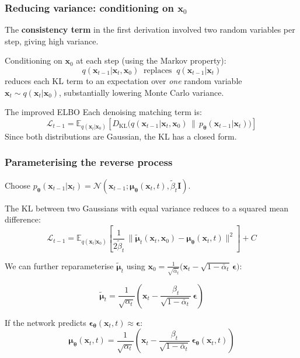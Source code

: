 \documentclass{beamer}
\newcommand{\E}{\mathbb{E}}
\newcommand{\DKL}{D_{\mathrm{KL}}}
\newcommand{\Norm}{\mathcal{N}}
\begin{document}
\begin{frame}
\frametitle{Reducing variance: conditioning on $\bm{x}_0$}

The \textbf{consistency term} in the first derivation involved
two random variables per step, giving high variance.

Conditioning on $\bm{x}_0$ at each step (using the Markov property):
\[
  q(\bm{x}_{t-1}|\bm{x}_t,\bm{x}_0)
  \;\;\text{replaces}\;\;
  q(\bm{x}_{t-1}|\bm{x}_t)
\]
reduces each KL term to an expectation over \emph{one} random variable
$\bm{x}_t \sim q(\bm{x}_t|\bm{x}_0)$, substantially lowering Monte Carlo variance.

\begin{block}{The improved ELBO}
Each denoising matching term is:
\[
  \mathcal{L}_{t-1}
  = \E_{q(\bm{x}_t|\bm{x}_0)}\!\left[
    \DKL\!\bigl(q(\bm{x}_{t-1}|\bm{x}_t,\bm{x}_0)\,\|\,
               p_{\bm{\theta}}(\bm{x}_{t-1}|\bm{x}_t)\bigr)
  \right]
\]
Since both distributions are Gaussian, the KL has a closed form.
\end{block}
\end{frame}

\begin{frame}
\frametitle{Parameterising the reverse process}

Choose $p_{\bm{\theta}}(\bm{x}_{t-1}|\bm{x}_t)
= \Norm(\bm{x}_{t-1};\bm{\mu}_{\bm{\theta}}(\bm{x}_t,t),\tilde\beta_t\mathbf{I})$.

The KL between two Gaussians with equal variance reduces to a squared
mean difference:
\[
  \mathcal{L}_{t-1}
  = \E_{q(\bm{x}_t|\bm{x}_0)}\!\left[
    \frac{1}{2\tilde\beta_t}\,
    \bigl\|\tilde{\bm{\mu}}_t(\bm{x}_t,\bm{x}_0)
          - \bm{\mu}_{\bm{\theta}}(\bm{x}_t,t)\bigr\|^2
  \right] + C
\]

We can further reparameterise $\tilde{\bm{\mu}}_t$ using
$\bm{x}_0 = \tfrac{1}{\sqrt{\bar\alpha_t}}\bigl(\bm{x}_t - \sqrt{1-\bar\alpha_t}\,\bm{\epsilon}\bigr)$:

\[
\tilde{\bm{\mu}}_t
= \frac{1}{\sqrt{\alpha_t}}\!\left(
    \bm{x}_t - \frac{\beta_t}{\sqrt{1-\bar\alpha_t}}\,\bm{\epsilon}
  \right)
\]

If the network predicts $\bm{\epsilon}_{\bm{\theta}}(\bm{x}_t,t)\approx\bm{\epsilon}$:
\[
\bm{\mu}_{\bm{\theta}}(\bm{x}_t,t)
= \frac{1}{\sqrt{\alpha_t}}\!\left(
    \bm{x}_t - \frac{\beta_t}{\sqrt{1-\bar\alpha_t}}\,\bm{\epsilon}_{\bm{\theta}}(\bm{x}_t,t)
  \right)
\]
\end{frame}
\end{document}
